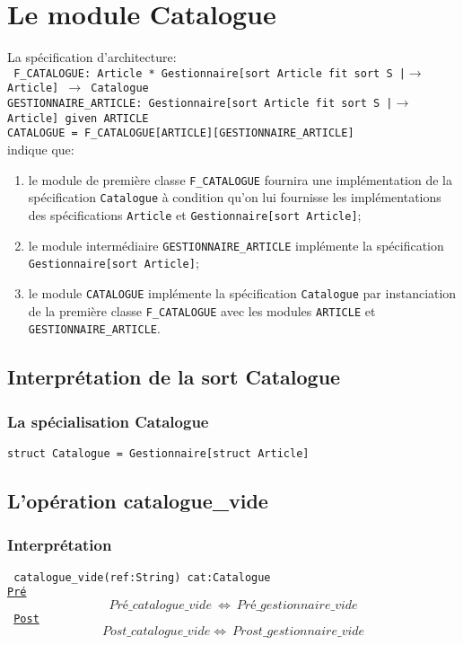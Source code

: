 \documentclass{article}
\begin{document}
\section{Le module Catalogue}
La spécification d'architecture:\\
{\tt
F\_CATALOGUE:  Article * Gestionnaire[sort Article fit sort S |$\rightarrow$ Article] $\rightarrow$ Catalogue\\
GESTIONNAIRE\_ARTICLE: Gestionnaire[sort Article fit sort S |$\rightarrow$ Article] given ARTICLE\\
CATALOGUE = F\_CATALOGUE[ARTICLE][GESTIONNAIRE\_ARTICLE]\\
}
indique que:
\begin{enumerate}
\item le module de première classe \texttt{F\_CATALOGUE} fournira une implémentation de la spécification \texttt{Catalogue} à condition qu'on lui fournisse les implémentations des spécifications \texttt{Article} et \texttt{Gestionnaire[sort Article]};
\item le module intermédiaire \texttt{GESTIONNAIRE\_ARTICLE} implémente la spécification \texttt{Gestionnaire[sort Article]};
\item le module \texttt{CATALOGUE} implémente la spécification \texttt{Catalogue} par instanciation de la première classe \texttt{F\_CATALOGUE} avec les modules \texttt{ARTICLE} et \texttt{GESTIONNAIRE\_ARTICLE}.
\end{enumerate}

\subsection{Interprétation de la sort Catalogue}
\subsubsection{La spécialisation Catalogue}
\begin{verbatim}
struct Catalogue = Gestionnaire[struct Article]
\end{verbatim}

\subsection{L'opération catalogue\_vide}
\subsubsection{Interprétation}
{\tt
catalogue\_vide(ref:String) cat:Catalogue\\
\underline{Pré}
$$ Pré\_catalogue\_vide\ \Leftrightarrow\ Pré\_gestionnaire\_vide $$
\underline{Post}
$$ Post\_catalogue\_vide \Leftrightarrow\ Prost\_gestionnaire\_vide $$
}
\end{document}

